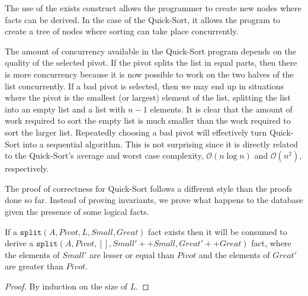 The use of the exists construct allows the programmer to create new nodes where
facts can be derived. In the case of the Quick-Sort, it allows the program to
create a tree of nodes where sorting can take place concurrently.

The amount of concurrency available in the Quick-Sort program depends on the
quality of the selected pivot. If the pivot splits the list in equal parts, then
there is more concurrency because it is now possible to work on the two halves of
the list concurrently. If a bad pivot is selected, then we may end up in
situations where the pivot is the smallest (or largest) element of the list,
splitting the list into an empty list and a list with $n-1$ elements. It is
clear that the amount of work required to sort the empty list is much smaller
than the work required to sort the larger list.  Repeatedly choosing a bad pivot
will effectively turn Quick-Sort into a sequential algorithm. This is not
surprising since it is directly related to the Quick-Sort's average and worst
case complexity, $\mathcal{O}(n \log{n})$ and $\mathcal{O}(n^2)$, respectively.

The proof of correctness for Quick-Sort follows a different style than the
proofs done so far. Instead of proving invariants, we prove what happens to the
database given the presence of some logical facts.

\begin{lemma}

If a $\mathtt{split}(A, Pivot, L, Small, Great)$ fact exists then it will be
consumed to derive a $\mathtt{split}(A, Pivot, [], Small' ++ Small, Great' ++
Great)$ fact, where the elements of $Small'$ are lesser or equal than $Pivot$
and the elements of $Great'$ are greater than $Pivot$.

\end{lemma}
\begin{proof}
By induction on the size of $L$.
\end{proof}


